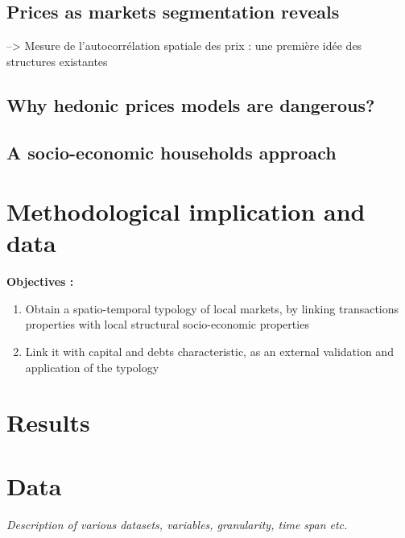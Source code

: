\subsection{Prices as markets segmentation reveals}

--> Mesure de l'autocorrélation spatiale des prix : une première idée des structures existantes


\subsection{Why hedonic prices models are dangerous?}

\subsection{A socio-economic households approach}

\section{Methodological implication and data}


\textbf{Objectives : }
\begin{enumerate}
\item Obtain a spatio-temporal typology of local markets, by linking transactions properties with local structural socio-economic properties
\item Link it with capital and debts characteristic, as an external validation and application of the typology 
\end{enumerate}

\section{Results}
\section{Data}

\textit{Description of various datasets, variables, granularity, time span etc.}


